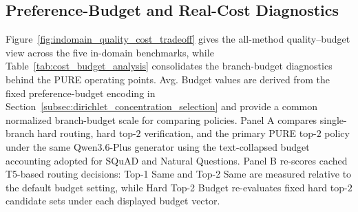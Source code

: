 \documentclass[a4paper,fleqn]{cas-dc}
\begin{document}
\FloatBarrier

\subsection{Preference-Budget and Real-Cost Diagnostics}
\label{subsec:cost_quality_tradeoff}

Figure~\ref{fig:indomain_quality_cost_tradeoff} gives the all-method quality--budget view across the five in-domain benchmarks, while Table~\ref{tab:cost_budget_analysis} consolidates the branch-budget diagnostics behind the PURE operating points. Avg. Budget values are derived from the fixed preference-budget encoding in Section~\ref{subsec:dirichlet_concentration_selection} and provide a common normalized branch-budget scale for comparing policies. Panel A compares single-branch hard routing, hard top-$2$ verification, and the primary PURE top-$2$ policy under the same Qwen3.6-Plus generator using the text-collapsed budget accounting adopted for SQuAD and Natural Questions. Panel B re-scores cached T5-based routing decisions: Top-1 Same and Top-2 Same are measured relative to the default budget setting, while Hard Top-2 Budget re-evaluates fixed hard top-$2$ candidate sets under each displayed budget vector.
\end{document}

